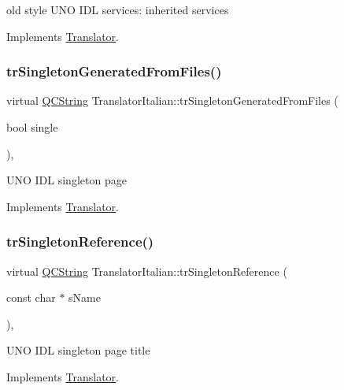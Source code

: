 old style U\+NO I\+DL services\+: inherited services 

Implements \mbox{\hyperlink{class_translator}{Translator}}.

\mbox{\label{class_translator_italian_a645bb1ff600b52842533554995f64f00}} 
\subsubsection{\texorpdfstring{trSingletonGeneratedFromFiles()}{trSingletonGeneratedFromFiles()}}
{\footnotesize\ttfamily virtual \mbox{\hyperlink{class_q_c_string}{Q\+C\+String}} Translator\+Italian\+::tr\+Singleton\+Generated\+From\+Files (\begin{DoxyParamCaption}\item[{bool}]{single }\end{DoxyParamCaption})\hspace{0.3cm}{\ttfamily [inline]}, {\ttfamily [virtual]}}

U\+NO I\+DL singleton page 

Implements \mbox{\hyperlink{class_translator}{Translator}}.

\mbox{\label{class_translator_italian_a9ed6b35c66e878d43fcd587e204a3b9b}} 
\subsubsection{\texorpdfstring{trSingletonReference()}{trSingletonReference()}}
{\footnotesize\ttfamily virtual \mbox{\hyperlink{class_q_c_string}{Q\+C\+String}} Translator\+Italian\+::tr\+Singleton\+Reference (\begin{DoxyParamCaption}\item[{const char $\ast$}]{s\+Name }\end{DoxyParamCaption})\hspace{0.3cm}{\ttfamily [inline]}, {\ttfamily [virtual]}}

U\+NO I\+DL singleton page title 

Implements \mbox{\hyperlink{class_translator}{Translator}}.

